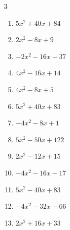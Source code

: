 \begin{multicols}{3}
\begin{enumerate}
  \item $5x^{2}+40x+84$


  \item $2x^{2}-8x+9$


\columnbreak %

  \item $-2x^{2}-16x-37$


  \item $4x^{2}-16x+14$


  \item $4x^{2}-8x+5$


  \item $5x^{2}+40x+83$


  \item $-4x^{2}-8x+1$


  \item $5x^{2}-50x+122$


  \item $2x^{2}-12x+15$


  \item $-4x^{2}-16x-17$


  \item $5x^{2}-40x+83$


  \item $-4x^{2}-32x-66$


\columnbreak %

  \item $2x^{2}+16x+33$



\end{enumerate}
\end{multicols}
